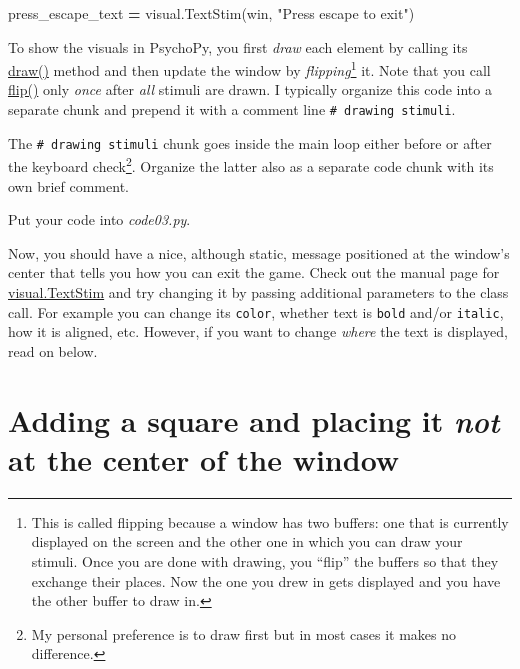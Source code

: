 \documentclass[
]{book}
\newenvironment{Shaded}{\begin{snugshade}}{\end{snugshade}}
\newcommand{\NormalTok}[1]{#1}
\newcommand{\OperatorTok}[1]{\textcolor[rgb]{0.81,0.36,0.00}{\textbf{#1}}}
\newcommand{\StringTok}[1]{\textcolor[rgb]{0.31,0.60,0.02}{#1}}
\begin{document}
\begin{Shaded}
\begin{Highlighting}[]
\NormalTok{press\_escape\_text }\OperatorTok{=}\NormalTok{ visual.TextStim(win, }\StringTok{"Press escape to exit"}\NormalTok{)}
\end{Highlighting}
\end{Shaded}

To show the visuals in PsychoPy, you first \emph{draw} each element by calling its \href{https://psychopy.org/api/visual/textstim.html\#psychopy.visual.TextStim.draw}{draw()} method and then update the window by \emph{flipping}\footnote{This is called flipping because a window has two buffers: one that is currently displayed on the screen and the other one in which you can draw your stimuli. Once you are done with drawing, you ``flip'' the buffers so that they exchange their places. Now the one you drew in gets displayed and you have the other buffer to draw in.} it. Note that you call \href{https://psychopy.org/api/visual/window.html\#psychopy.visual.Window.flip}{flip()} only \emph{once} after \emph{all} stimuli are drawn. I typically organize this code into a separate chunk and prepend it with a comment line \texttt{\#\ drawing\ stimuli}.

The \texttt{\#\ drawing\ stimuli} chunk goes inside the main loop either before or after the keyboard check\footnote{My personal preference is to draw first but in most cases it makes no difference.}. Organize the latter also as a separate code chunk with its own brief comment.

Put your code into \emph{code03.py}.

Now, you should have a nice, although static, message positioned at the window's center that tells you how you can exit the game. Check out the manual page for \href{https://psychopy.org/api/visual/textstim.html}{visual.TextStim} and try changing it by passing additional parameters to the class call. For example you can change its \texttt{color}, whether text is \texttt{bold} and/or \texttt{italic}, how it is aligned, etc. However, if you want to change \emph{where} the text is displayed, read on below.

\hypertarget{adding-a-square-and-placing-it-not-at-the-center-of-the-window}{%
\section{\texorpdfstring{Adding a square and placing it \emph{not} at the center of the window}{Adding a square and placing it not at the center of the window}}\label{adding-a-square-and-placing-it-not-at-the-center-of-the-window}}
\end{document}
